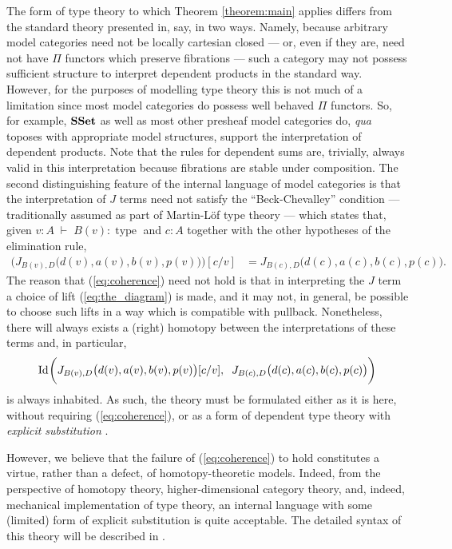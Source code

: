 \documentclass{amsart}
\newcommand{\judge}[2]{#1\;\vdash\;#2}
\newcommand{\ssets}{\textnormal{\textbf{SSet}}}
\newcommand{\id}[1]{\textnormal{Id}_{#1}}
\newcommand{\type}{\operatorname{type}}
\theoremstyle{definition}
\theoremstyle{remark}
\begin{document}
The form of type theory to which Theorem \ref{theorem:main} applies
differs from the standard theory presented in, say,
\cite{MartinLof:ITT} in two ways. Namely, because arbitrary model
categories need not be locally
cartesian closed --- or, even if they are, need not have $\Pi$ functors which preserve
fibrations --- such a category may not possess sufficient structure to
interpret dependent products in the standard way.  However, for the purposes of
modelling type theory this is not much of a limitation since most
model categories do possess well behaved $\Pi$ functors.  So, for
example, $\ssets$ as well as most other presheaf model categories
do, \emph{qua} toposes with appropriate model structures, support the
interpretation of dependent products.  Note that the
rules for dependent sums are, trivially, always valid in this
interpretation because fibrations are stable under composition.  The second
distinguishing feature of the internal language of model categories is
that the interpretation of $J$ terms need not satisfy the
``Beck-Chevalley'' condition --- traditionally assumed as part of
Martin-L\"{o}f type theory --- which states that, given
$\judge{v:A}{B(v):\type}$ and $c:A$ together
with the other hypotheses of the elimination rule,
\begin{align}\label{eq:coherence}
  \biggl(J_{B(v),D}\bigl(d(v),a(v),b(v),p(v)\bigr)\biggr)[c/v] & = J_{B(c),D}\bigl(d(c),a(c),b(c),p(c)\bigr).
\end{align}
The reason that (\ref{eq:coherence}) need not hold is that in
interpreting the $J$ term a choice of lift (\ref{eq:the_diagram}) is
made, and it may not, in general, be possible
to choose such lifts in a way which is compatible with pullback.
Nonetheless, there will always exists a (right)
homotopy between the interpretations of these terms and, in particular,
\begin{align*}
  \id{}\biggl(J_{B(v),D}\bigl(d(v),a(v),b(v),p(v)\bigr)[c/v],\;\;J_{B(c),D}\bigl(d(c),a(c),b(c),p(c)\bigr)\biggr)
\end{align*}
is always inhabited.  As such, the theory must be formulated either
as it is here, without requiring (\ref{eq:coherence}), or as a
form of dependent type theory with \emph{explicit substitution}
\cite{Abadi:ES,Curien:SUI}.

However, we believe that the failure of (\ref{eq:coherence}) to hold
constitutes a virtue, rather than a defect, of homotopy-theoretic
models.  Indeed, from the perspective of homotopy theory,
higher-dimensional category theory, and, indeed, mechanical
implementation of type theory, an internal language with some
(limited) form of explicit substitution is quite acceptable.  The
detailed syntax of this theory will be described in \cite{Warren:PhD}.
\end{document}
